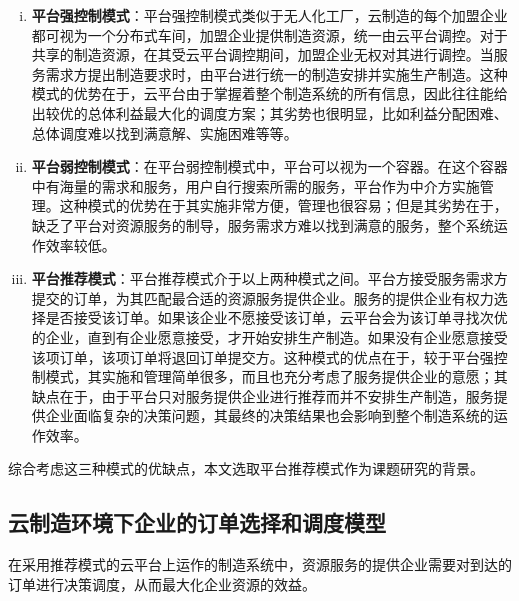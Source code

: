 \documentclass[UTF8]{ctexart}
\begin{document}
\begin{enumerate}[(i)]
\item \textbf{平台强控制模式}：平台强控制模式类似于无人化工厂，云制造的每个加盟企业都可视为一个分布式车间，加盟企业提供制造资源，统一由云平台调控。对于共享的制造资源，在其受云平台调控期间，加盟企业无权对其进行调控。当服务需求方提出制造要求时，由平台进行统一的制造安排并实施生产制造。这种模式的优势在于，云平台由于掌握着整个制造系统的所有信息，因此往往能给出较优的总体利益最大化的调度方案；其劣势也很明显，比如利益分配困难、总体调度难以找到满意解、实施困难等等。
\item \textbf{平台弱控制模式}：在平台弱控制模式中，平台可以视为一个容器。在这个容器中有海量的需求和服务，用户自行搜索所需的服务，平台作为中介方实施管理。这种模式的优势在于其实施非常方便，管理也很容易；但是其劣势在于，缺乏了平台对资源服务的制导，服务需求方难以找到满意的服务，整个系统运作效率较低。
\item \textbf{平台推荐模式}：平台推荐模式介于以上两种模式之间。平台方接受服务需求方提交的订单，为其匹配最合适的资源服务提供企业。服务的提供企业有权力选择是否接受该订单。如果该企业不愿接受该订单，云平台会为该订单寻找次优的企业，直到有企业愿意接受，才开始安排生产制造。如果没有企业愿意接受该项订单，该项订单将退回订单提交方。这种模式的优点在于，较于平台强控制模式，其实施和管理简单很多，而且也充分考虑了服务提供企业的意愿；其缺点在于，由于平台只对服务提供企业进行推荐而并不安排生产制造，服务提供企业面临复杂的决策问题，其最终的决策结果也会影响到整个制造系统的运作效率。

\end{enumerate}

综合考虑这三种模式的优缺点，本文选取平台推荐模式作为课题研究的背景。

\subsection{云制造环境下企业的订单选择和调度模型}
\label{concrete model}
在采用推荐模式的云平台上运作的制造系统中，资源服务的提供企业需要对到达的订单进行决策调度，从而最大化企业资源的效益。
\end{document}

